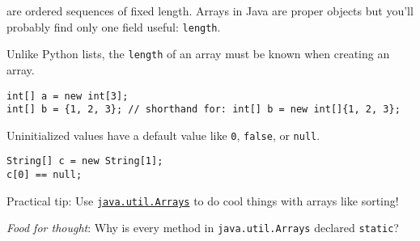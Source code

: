  are ordered sequences of fixed length. Arrays in Java are proper objects but you'll probably find only one field useful: \texttt{length}.

Unlike Python lists, the \texttt{length} of an array must be known when creating an array.

\begin{lstlisting}
int[] a = new int[3];
int[] b = {1, 2, 3}; // shorthand for: int[] b = new int[]{1, 2, 3};
\end{lstlisting}

Uninitialized values have a default value like \texttt{0}, \texttt{false}, or \texttt{null}.

\begin{lstlisting}
String[] c = new String[1];
c[0] == null;
\end{lstlisting}

Practical tip: Use \href{https://docs.oracle.com/javase/8/docs/api/java/util/Arrays.html}{\texttt{java.util.Arrays}} to do cool things with arrays like sorting!

\textit{Food for thought}: Why is every method in \texttt{java.util.Arrays} declared \texttt{static}?